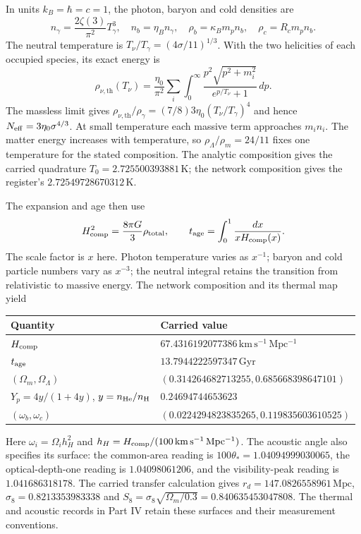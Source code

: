 \documentclass[aps,prx,onecolumn,10pt,notitlepage,nofootinbib,longbibliography]{revtex4-2}
\numberwithin{equation}{section}
\numberwithin{table}{section}
\begin{document}
In units $k_B=\hbar=c=1$, the photon, baryon and cold densities are
\begin{equation}
 n_\gamma=\frac{2\zeta(3)}{\pi^2}T_\gamma^3,
 \quad n_b=\eta_Bn_\gamma,
 \quad \rho_b=\kappa_Bm_pn_b,
 \quad \rho_c=R_cm_pn_b.
 \label{eq:thermaldensities}
\end{equation}
The neutral temperature is $T_\nu/T_\gamma=(4\sigma/11)^{1/3}$.
With the two helicities of each occupied species, its exact energy is
\begin{equation}
 \rho_{\nu,\mathrm{th}}(T_\nu)=\frac{\eta_0}{\pi^2}\sum_i
 \int_0^\infty\frac{p^2\sqrt{p^2+m_i^2}}{e^{p/T_\nu}+1}\,dp.
 \label{eq:neutralthermal}
\end{equation}
The massless limit gives
$\rho_{\nu,\mathrm{th}}/\rho_\gamma=(7/8)3\eta_0(T_\nu/T_\gamma)^4$ and hence
$N_{\rm eff}=3\eta_0\sigma^{4/3}$. At small temperature each massive
term approaches $m_i n_i$. The matter energy increases with temperature,
so $\rho_\Lambda/\rho_m=24/11$ fixes one temperature for the stated
composition. The analytic composition gives the carried quadrature
$T_0=2.725500393881\,\mathrm K$; the network composition gives the
register's $2.72549728670312\,\mathrm K$.

The expansion and age then use
\begin{equation}
 H_{\rm comp}^2=\frac{8\pi G}{3}\rho_{\rm total},\qquad
 t_{\rm age}=\int_0^1\frac{dx}{xH_{\rm comp}(x)}.
 \label{eq:thermalage}
\end{equation}
The scale factor is $x$ here. Photon temperature varies as $x^{-1}$;
baryon and cold particle numbers vary as $x^{-3}$; the neutral integral
retains the transition from relativistic to massive energy. The network
composition and its thermal map yield
\begin{center}\small
\begin{tabular}{@{}ll@{}}
\toprule Quantity&Carried value\\\midrule
$H_{\rm comp}$&$67.4316192077386\,\mathrm{km\,s^{-1}\,Mpc^{-1}}$\\
$t_{\rm age}$&$13.7944222597347\,\mathrm{Gyr}$\\
$(\Omega_m,\Omega_\Lambda)$&$(0.314264682713255,0.685668398647101)$\\
$Y_p=4y/(1+4y)$, $y=n_{\rm He}/n_{\rm H}$&$0.24694744653623$\\
$(\omega_b,\omega_c)$&$(0.0224294823835265,0.119835603610525)$\\\bottomrule
\end{tabular}
\end{center}
Here $\omega_i=\Omega_i h_H^2$ and
$h_H=H_{\rm comp}/(100\,\mathrm{km\,s^{-1}\,Mpc^{-1}})$. The acoustic
angle also specifies its surface: the common-area reading is
$100\theta_*=1.04094999030065$, the optical-depth-one reading is
$1.04098061206$, and the visibility-peak reading is $1.041686318178$.
The carried transfer calculation gives $r_d=147.0826558961\,\mathrm{Mpc}$,
$\sigma_8=0.8213353983338$ and
$S_8=\sigma_8\sqrt{\Omega_m/0.3}=0.840635453047808$.
The thermal and acoustic records in Part IV retain these surfaces and their
measurement conventions.
\end{document}
